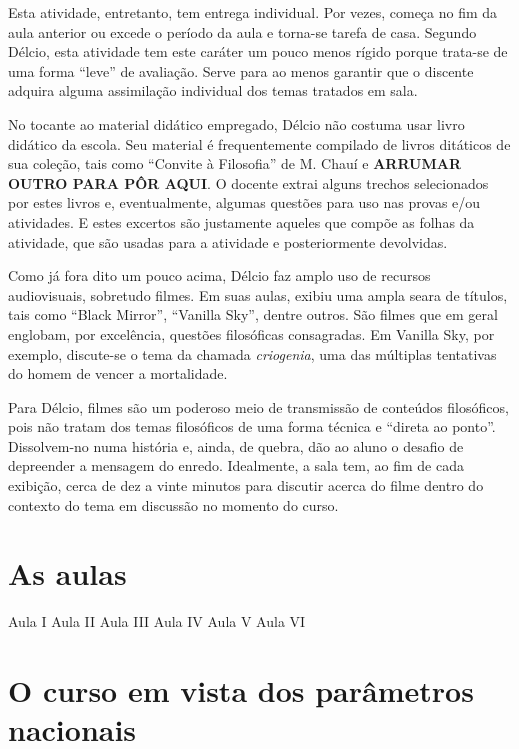 \documentclass[12pt,a4paper]{article}
\begin{document}
    Esta atividade, entretanto, tem entrega individual. Por vezes, começa no 
    fim da aula anterior ou excede o período da aula e torna-se tarefa de casa. 
    Segundo Délcio, esta atividade tem este caráter um pouco menos rígido 
    porque trata-se de uma forma ``leve'' de avaliação. Serve para ao menos 
    garantir que o discente adquira alguma assimilação individual dos temas 
    tratados em sala. 
    
    No tocante ao material didático empregado, Délcio não costuma usar livro 
    didático da escola. Seu material é frequentemente compilado de livros 
    ditáticos de sua coleção, tais como ``Convite à Filosofia'' de M. Chauí e 
    \textbf{ARRUMAR OUTRO PARA PÔR AQUI}. O docente extrai alguns trechos 
    selecionados por estes livros e, eventualmente, algumas questões para uso 
    nas provas e/ou atividades. E estes excertos são justamente aqueles que 
    compõe as folhas da atividade, que são usadas para a atividade e 
    posteriormente devolvidas. 
    
    Como já fora dito um pouco acima, Délcio faz amplo uso de recursos 
    audiovisuais, sobretudo filmes. Em suas aulas, exibiu uma ampla seara 
    de títulos, tais como ``Black Mirror'', ``Vanilla Sky'', dentre outros. 
    São filmes que em geral englobam, por excelência, questões filosóficas 
    consagradas. Em Vanilla Sky, por exemplo, discute-se o tema da chamada 
    \textit{criogenia}, uma das múltiplas tentativas do homem de vencer a 
    mortalidade. 
    
    Para Délcio, filmes são um poderoso meio de transmissão de conteúdos 
    filosóficos, pois não tratam dos temas filosóficos de uma forma técnica e 
    ``direta ao ponto''. Dissolvem-no numa história e, ainda, de quebra, dão ao 
    aluno o desafio de depreender a mensagem do enredo. Idealmente, a sala tem, 
    ao fim de cada exibição, cerca de dez a vinte minutos para discutir acerca 
    do filme dentro do contexto do tema em discussão no momento do curso. 
    
    
    	
	\newpage
	
	\section{As aulas}

    Aula I
    Aula II
    Aula III
    Aula IV
    Aula V
    Aula VI	

	
	\newpage
		
	\section{O curso em vista dos parâmetros nacionais}
	
\end{document}
